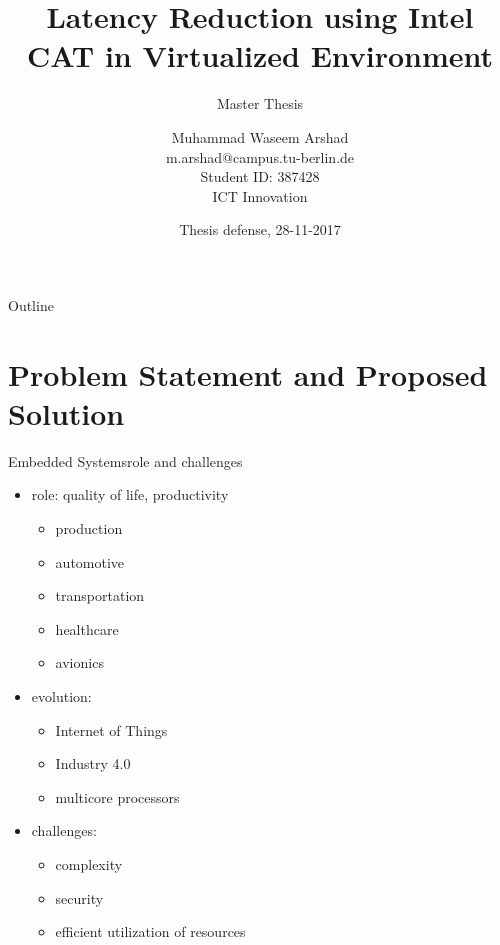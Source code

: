 \documentclass[10pt,hyperref={hyperfootnotes=false}, xcolor={usenames, dvipsnames}]{beamer}
\title{Latency Reduction using Intel CAT in Virtualized
Environment}
\subtitle{Master Thesis}
\author{Muhammad Waseem Arshad\inst{1} \\ \scriptsize{m.arshad@campus.tu-berlin.de} \\ \scriptsize{Student ID: 387428} \\ \scriptsize{ICT Innovation}}
\institute[TU Berlin] %
{
  \inst{1}
  Department of Security in Telecommunications,\\
  Electrical Engineering and Computer Science Faculty,\\
  {Technische Universit{\"a}t Berlin}
}
\date{Thesis defense, 28-11-2017}
\begin{document}
\begin{frame}
  \titlepage
\end{frame}

\begin{frame}[allowframebreaks]{Outline}
  \small\tableofcontents
\end{frame}

\section{Problem Statement and Proposed Solution}
\begin{frame}{Embedded Systems}{role and challenges}
  \begin{itemize}
  \item {role: quality of life, \pause{} productivity\pause{} 
			\begin{itemize}
			  \item {production}
			  \item {automotive}
			  \item {transportation}
		  	  \item {healthcare}
			  \item {avionics}
			 \end{itemize}
		}
		\pause{}
	
  \item {evolution:\pause{}
		 \begin{itemize}
      	  \item {Internet of Things} \pause{} 
		  \item {Industry 4.0} \pause{}
		  \item {multicore processors \pause{}}
	     \end{itemize}
		}
  \item {challenges: 
          \begin{itemize}
      	   \item {complexity} \pause{}
		   \item {security}  \pause{}
		   \item {efficient utilization of resources}
	      \end{itemize}
		}
  \end{itemize}
\end{frame}
\end{document}
